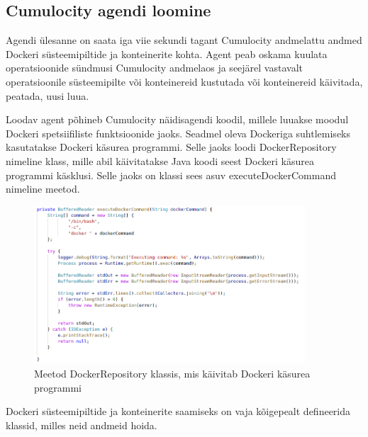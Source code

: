 \documentclass[12pt]{article}
\begin{document}
 \FloatBarrier


  



 






 \subsection{Cumulocity agendi loomine}
 Agendi ülesanne on saata iga viie sekundi tagant Cumulocity andmelattu andmed
 Dockeri süsteemipiltide ja konteinerite kohta. Agent peab oskama kuulata
 operatsioonide sündmusi Cumulocity andmelaos ja seejärel vastavalt operatsioonile
 süsteemipilte või konteinereid kustutada või konteinereid käivitada, peatada, uusi luua.

 Loodav agent põhineb Cumulocity näidisagendi koodil, millele luuakse moodul Dockeri spetsiifiliste
 funktsioonide jaoks. Seadmel oleva Dockeriga suhtlemiseks kasutatakse Dockeri käsurea
 programmi. Selle jaoks loodi DockerRepository nimeline klass, mille abil käivitatakse Java
 koodi seest Dockeri käsurea programmi käsklusi. Selle jaoks on klassi sees asuv
 executeDockerCommand nimeline meetod. 


 \begin{figure} [ht] %
 \begin{center}
 \includegraphics[width=0.9\textwidth]{dockerdriver_repository_executecmd}
 \caption{Meetod DockerRepository klassis, mis käivitab Dockeri käsurea programmi}
 \label{fig:dockerdriver_repository_executecmd}
 \end{center}
 \end{figure}
 
 \FloatBarrier

 Dockeri süsteemipiltide ja konteinerite saamiseks on vaja kõigepealt defineerida klassid,
 milles neid andmeid hoida.
  
\end{document}
